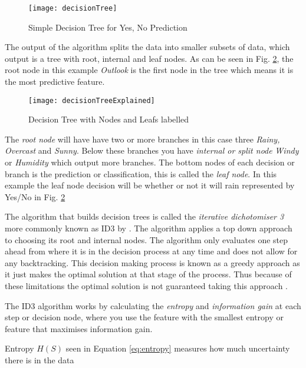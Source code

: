 \begin{figure}[H]
	\texttt{[image: decisionTree]}
	\caption{Simple Decision Tree for Yes, No Prediction \\ \cite[Source:][]{quinlan_induction_1986}}
	\label{fig:decisionTree}
\end{figure}

The output of the algorithm splits the data into smaller subsets of data, which output is a tree with root, internal and leaf nodes. As can be seen in Fig. \ref{fig:decisionTreeExplained}, the root node in this example \textit{Outlook} is the first node in the tree which means it is the most predictive feature. 

\begin{figure}[H]
	\texttt{[image: decisionTreeExplained]}
	\caption{Decision Tree with Nodes and Leafs labelled}
	\label{fig:decisionTreeExplained}
\end{figure}

The \textit{root node} will have have two or more branches in this case three \textit{Rainy, Overcast} and \textit{Sunny}. Below these branches you have \textit{internal or split node} \textit{Windy} or \textit{Humidity} which output more branches. The bottom nodes of each decision or branch is the prediction or classification, this is called the \textit{leaf node}. In this example the leaf node decision will be whether or not it will rain represented by Yes/No in Fig. \ref{fig:decisionTreeExplained}

The algorithm that builds decision trees is called the \textit{iterative dichotomiser 3} more commonly known as ID3 by \cite{quinlan_induction_1986}. The algorithm applies a top down approach to choosing its root and internal nodes. The algorithm only evaluates one step ahead from where it is in the decision process at any time and does not allow for any backtracking. This decision making process is known as a greedy approach as it just makes the optimal solution at that stage of the process. Thus because of these limitations the optimal solution is not guaranteed taking this approach \citep{friedman_lazy_1996}.

The ID3 algorithm works by calculating the \textit{entropy} and \textit{information gain} at each step or decision node, where you use the feature with the smallest entropy or feature that maximises information gain.

Entropy $H(S)$ seen in Equation \ref{eq:entropy} measures how much uncertainty there is in the data \citep{shannon_mathematical_2001}

